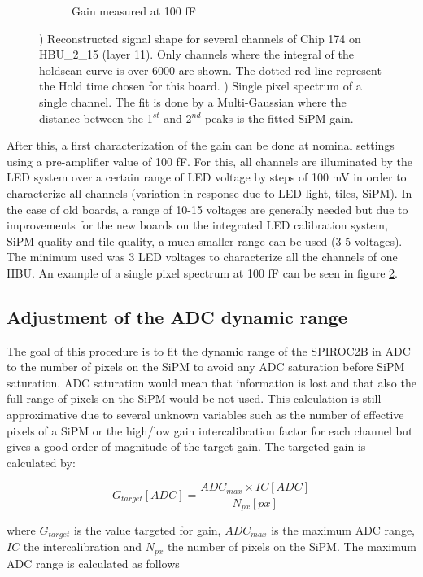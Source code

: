 \begin{figure}[htbp!]
\begin{subfigure}[t]{0.49\textwidth}
    \caption{Gain measured at 100 fF} \label{fig:Gain100fF}
  \end{subfigure}
  \caption{) Reconstructed signal shape for several channels of Chip 174 on HBU\_{}2\_{}15 (layer 11). Only channels where the integral of the holdscan curve is over 6000 are shown. The dotted red line represent the Hold time chosen for this board. ) Single pixel spectrum of a single channel. The fit is done by a Multi-Gaussian where the distance between the 1$^{st}$ and 2$^{nd}$ peaks is the fitted SiPM gain.}
\end{figure}

After this, a first characterization of the gain can be done at nominal settings using a pre-amplifier value of 100 fF. For this, all channels are illuminated by the LED system over a certain range of LED voltage by steps of 100 mV in order to characterize all channels (variation in response due to LED light, tiles, SiPM). In the case of old boards, a range of 10-15 voltages are generally needed but due to improvements for the new boards on the integrated LED calibration system, SiPM quality and tile quality, a much smaller range can be used (3-5 voltages). The minimum used was 3 LED voltages to characterize all the channels of one HBU. An example of a single pixel spectrum at 100 fF can be seen in figure \ref{fig:Gain100fF}.

\subsection{Adjustment of the ADC dynamic range}

The goal of this procedure is to fit the dynamic range of the SPIROC2B in ADC to the number of pixels on the SiPM to avoid any ADC saturation before SiPM saturation. ADC saturation would mean that information is lost and that also the full range of pixels on the SiPM would be not used. This calculation is still approximative due to several unknown variables such as the number of effective pixels of a SiPM or the high/low gain intercalibration factor for each channel but gives a good order of magnitude of the target gain. The targeted gain is calculated by:

\begin{equation}
  G_{target} [ADC] = \frac{ADC_{max} \times IC [ADC]}{N_{px} [px]}
\end{equation}

where $G_{target}$ is the value targeted for gain, $ADC_{max}$ is the maximum ADC range, $IC$ the intercalibration and $N_{px}$ the number of pixels on the SiPM. The maximum ADC range is calculated as follows

